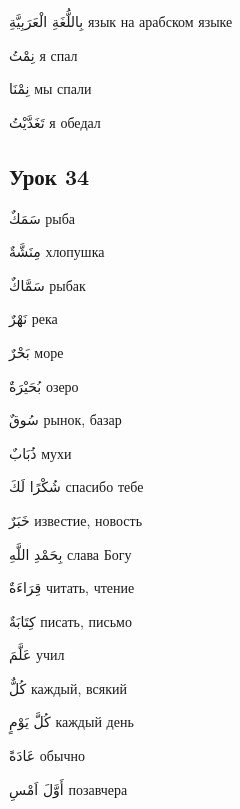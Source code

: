 \documentclass[a5paper]{article}
\newcommand\textstyleDropCaps[1]{#1}
\newcommand\textstyleCaptioncharacters[1]{#1}
\begin{document}
\textstyleCaptioncharacters{بِاللُّغَةِ الْعَرَبِيَّةِ }\textstyleDropCaps{язык на арабском языке‎}

\textstyleCaptioncharacters{نِمْتُ }\textstyleDropCaps{я спал‎}

\textstyleCaptioncharacters{نِمْنَا }\textstyleDropCaps{мы спали‎}

\textstyleCaptioncharacters{تَغَدَّيْتُ }\textstyleDropCaps{я обедал‎}

\subsection[Урок 34‎]{\textstyleDropCaps{Урок 34‎}}
\textstyleCaptioncharacters{سَمَكٌ }\textstyleDropCaps{рыба‎}

\textstyleCaptioncharacters{مِنَشَّةٌ }\textstyleDropCaps{хлопушка‎}

\textstyleCaptioncharacters{سَمَّاكٌ }\textstyleDropCaps{рыбак‎}

\textstyleCaptioncharacters{نَهْرٌ }\textstyleDropCaps{река‎}

\textstyleCaptioncharacters{بَحْرٌ }\textstyleDropCaps{море‎}

\textstyleCaptioncharacters{بُحَيْرَةٌ }\textstyleDropCaps{озеро‎}

\textstyleCaptioncharacters{سُوقٌ }\textstyleDropCaps{рынок, базар‎}

\textstyleCaptioncharacters{ذُبَابٌ }\textstyleDropCaps{мухи‎}

\textstyleCaptioncharacters{شُكْرًا لَكَ }\textstyleDropCaps{спасибо тебе‎}

\textstyleCaptioncharacters{خَبَرٌ }\textstyleDropCaps{известие, новость‎}

\textstyleCaptioncharacters{بِحَمْدِ اللَّهِ }\textstyleDropCaps{слава Богу‎}

\textstyleCaptioncharacters{قِرَاءَةٌ }\textstyleDropCaps{читать, чтение‎}

\textstyleCaptioncharacters{كِتَابَةٌ }\textstyleDropCaps{писать, письмо‎}

\textstyleCaptioncharacters{عَلَّمَ }\textstyleDropCaps{учил‎}

\textstyleCaptioncharacters{كُلٌّ }\textstyleDropCaps{каждый, всякий‎}

\textstyleCaptioncharacters{كُلَّ يَوْمٍ }\textstyleDropCaps{каждый день‎}

\textstyleCaptioncharacters{عَادَةً }\textstyleDropCaps{обычно‎}

\textstyleCaptioncharacters{أَوَّلَ اَمْسِ }\textstyleDropCaps{позавчера‎}
\end{document}
